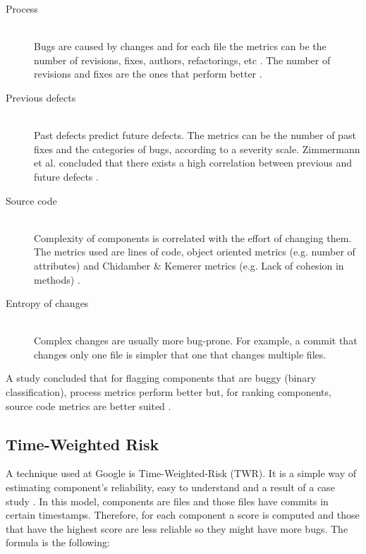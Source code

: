 \begin{description}
  \item[Process] \hfill \\
  Bugs are caused by changes and for each file the metrics can be the number
  of revisions, fixes, authors, refactorings, etc
  \cite{Moser:2008:CAE:1368088.1368114}. The number of revisions and fixes are
  the ones that perform better
  \cite{Zimmermann:2007:PDE:1268984.1269057, 859533}.

 \item[Previous defects] \hfill \\
 Past defects predict future defects. The metrics can be the number of past
 fixes and the categories of bugs, according to a severity scale. Zimmermann et
 al. concluded that there exists a high correlation between previous and future
 defects \cite{Zimmermann:2007:PDE:1268984.1269057}.

 \item[Source code] \hfill \\
 Complexity of components is correlated with the effort of changing them. The
 metrics used are lines of code, object oriented metrics (e.g. number of
 attributes) and Chidamber \& Kemerer metrics (e.g. Lack of cohesion in methods)
 \cite{295895}.

 \item[Entropy of changes] \hfill \\
 Complex changes are usually more bug-prone. For example, a commit that changes
 only one file is simpler that one that changes multiple files.
\end{description}

A study concluded that for flagging components that are buggy (binary
classification), process metrics perform better but, for ranking components,
source code metrics are better suited \cite{D'Ambros:2012:EDP:2318097.2318149}.

\subsection{Time-Weighted Risk}
A technique used at Google is Time-Weighted-Risk (TWR). It is a simple way of
estimating component's reliability, easy to understand and a result of a case
study \cite{Chris2013}. In this model, components are files and those files
have commits in certain timestamps. Therefore, for each component a score is
computed and those that have the highest score are less reliable so they might
have more bugs. The formula is the following:

